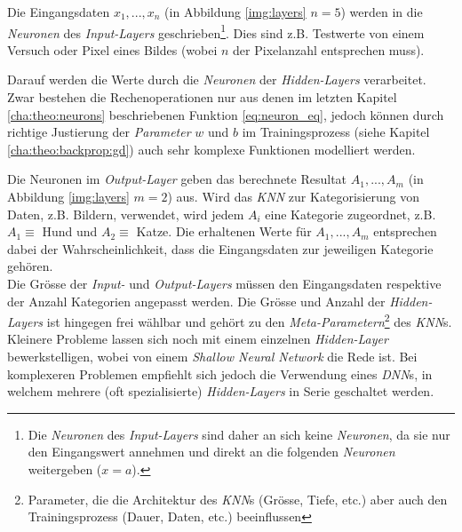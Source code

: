 Die Eingangsdaten $x_1,...,x_n$ (in Abbildung \ref{img:layers} $n=5$) werden in die \textit{Neuronen} des \textit{Input-Layers} geschrieben\footnote{Die \textit{Neuronen} des \textit{Input-Layers} sind daher an sich keine \textit{Neuronen}, da sie nur den Eingangswert annehmen und direkt an die folgenden \textit{Neuronen} weitergeben ($x = a$).}. Dies sind z.B. Testwerte von einem Versuch oder Pixel eines Bildes (wobei $n$ der Pixelanzahl entsprechen muss).

Darauf werden die Werte durch die \textit{Neuronen} der \textit{Hidden-Layers} verarbeitet. Zwar bestehen die Rechenoperationen nur aus denen im letzten Kapitel \ref{cha:theo:neurons} beschriebenen Funktion \ref{eq:neuron_eq}, jedoch können durch richtige Justierung der \textit{Parameter} $w$ und $b$ im Trainingsprozess (siehe Kapitel \ref{cha:theo:backprop:gd}) auch sehr komplexe Funktionen modelliert werden.

Die Neuronen im \textit{Output-Layer} geben das berechnete Resultat $A_1,...,A_m$ (in Abbildung \ref{img:layers} $m=2$) aus. Wird das \textit{KNN} zur Kategorisierung von Daten, z.B. Bildern, verwendet, wird jedem $A_i$ eine Kategorie zugeordnet, z.B. $A_1 \equiv$ Hund und $A_2 \equiv$ Katze. Die erhaltenen Werte für $A_1,...,A_m$ entsprechen dabei der Wahrscheinlichkeit, dass die Eingangsdaten zur jeweiligen Kategorie gehören.\\

Die Grösse der \textit{Input-} und \textit{Output-Layers} müssen den Eingangsdaten respektive der Anzahl Kategorien angepasst werden. Die Grösse und Anzahl der \textit{Hidden-Layers} ist hingegen frei wählbar und gehört zu den \textit{Meta-Parametern}\footnote{Parameter, die die Architektur des \textit{KNN}s (Grösse, Tiefe, etc.) aber auch den Trainingsprozess (Dauer, Daten, etc.) beeinflussen} des \textit{KNN}s. Kleinere Probleme lassen sich noch mit einem einzelnen \textit{Hidden-Layer} bewerkstelligen, wobei von einem \textit{Shallow Neural Network} die Rede ist. Bei komplexeren Problemen empfiehlt sich jedoch die Verwendung eines \textit{DNN}s, in welchem mehrere (oft spezialisierte) \textit{Hidden-Layers} in Serie geschaltet werden.\\

